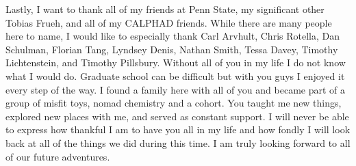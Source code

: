Lastly, I want to thank all of my friends at Penn State, my significant other Tobias Frueh, and all of my CALPHAD friends. While there are many people here to name, I would like to especially thank Carl Arvhult, Chris Rotella, Dan Schulman, Florian Tang, Lyndsey Denis, Nathan Smith, Tessa Davey, Timothy Lichtenstein, and Timothy Pillsbury. Without all of you in my life I do not know what I would do. Graduate school can be difficult but with you guys I enjoyed it every step of the way. I found a family here with all of you and became part of a group of misfit toys, nomad chemistry and a cohort. You taught me new things, explored new places with me, and served as constant support. I will never be able to express how thankful I am to have you all in my life and how fondly I will look back at all of the things we did during this time. I am truly looking forward to all of our future adventures.